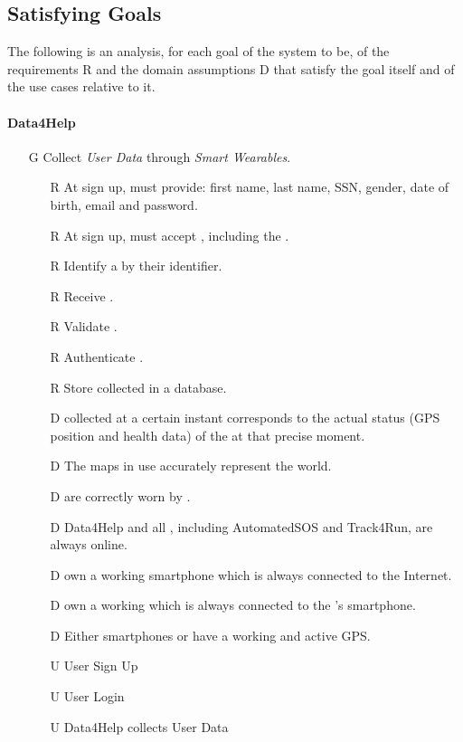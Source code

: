 \documentclass[../../../rasd.tex]{subfiles}
\begin{document}
\subsection{Satisfying Goals}
The following is an analysis, for each goal of the system to be, of the requirements R and the domain assumptions D that satisfy the goal itself and of the use cases relative to it.
\paragraph{Data4Help}
\begin{itemize}

    \item[G\subs{1}]Collect \textit{User Data} through \textit{Smart Wearables}.
    \begin{itemize}
        \item[R\subs{2}]At sign up,  must provide: first name, last name, SSN, gender, date of birth, email and password.
        \item[R\subs{4}]At sign up,  must accept , including the .
        \item[R\subs{6}]Identify a  by their identifier.
        \item[R\subs{8}]Receive .
        \item[R\subs{9}]Validate .
        \item[R\subs{10}]Authenticate .
        \item[R\subs{11}]Store collected  in a database.
        \\
        \item[D\subs{2}] collected at a certain instant corresponds to the actual status (GPS position and health data) of the  at that precise moment.              
        \item[D\subs{3}]The maps in use accurately represent the world.
        \item[D\subs{8}] are correctly worn by .
        \item[D\subs{9}]Data4Help and all , including AutomatedSOS and Track4Run, are always online.
        \item[D\subs{10}] own a working smartphone which is always connected to the Internet.
        \item[D\subs{11}] own a working  which is always connected to the 's smartphone.
        \item[D\subs{12}]Either smartphones or  have a working and active GPS.
        \\
        \item[U\subs{1}]User Sign Up
        \item[U\subs{3}]User Login
        \item[U\subs{5}]Data4Help collects User Data


\end{itemize}
\end{itemize}
\end{document}
